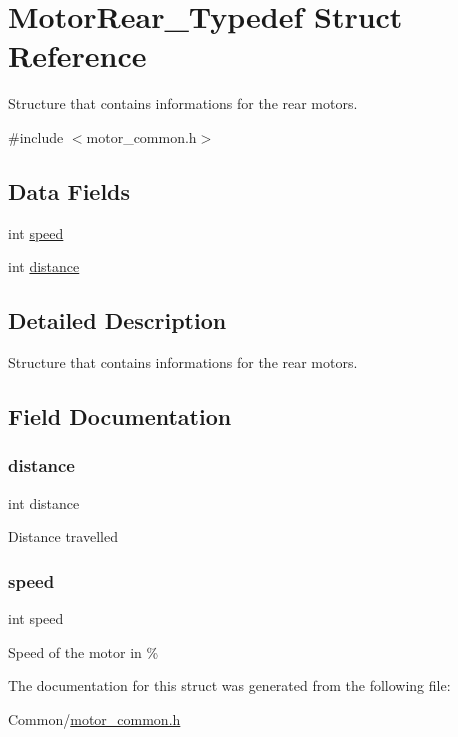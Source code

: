 \hypertarget{struct_motor_rear___typedef}{}\section{Motor\+Rear\+\_\+\+Typedef Struct Reference}
\label{struct_motor_rear___typedef}


Structure that contains informations for the rear motors.  




{\ttfamily \#include $<$motor\+\_\+common.\+h$>$}

\subsection*{Data Fields}
\begin{DoxyCompactItemize}
\item 
int \hyperlink{struct_motor_rear___typedef_a218b4f7c6cc2681a99c23a3b089d68b1}{speed}
\item 
int \hyperlink{struct_motor_rear___typedef_afb9412686cd344ad61757c1c19ba8a87}{distance}
\end{DoxyCompactItemize}


\subsection{Detailed Description}
Structure that contains informations for the rear motors. 

\subsection{Field Documentation}
\mbox{\label{struct_motor_rear___typedef_afb9412686cd344ad61757c1c19ba8a87}} 
\subsubsection{\texorpdfstring{distance}{distance}}
{\footnotesize\ttfamily int distance}

Distance travelled \mbox{\label{struct_motor_rear___typedef_a218b4f7c6cc2681a99c23a3b089d68b1}} 
\subsubsection{\texorpdfstring{speed}{speed}}
{\footnotesize\ttfamily int speed}

Speed of the motor in \% 

The documentation for this struct was generated from the following file\+:\begin{DoxyCompactItemize}
\item 
Common/\hyperlink{motor__common_8h}{motor\+\_\+common.\+h}\end{DoxyCompactItemize}
